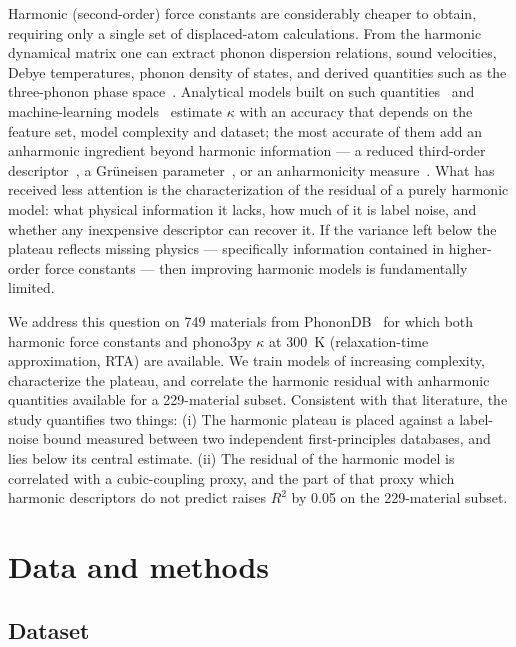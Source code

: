 \documentclass[aps,prm,reprint,onecolumn,groupedaddress]{revtex4-2}
\begin{document}
Harmonic (second-order) force constants are considerably cheaper to obtain, requiring only a single set of displaced-atom calculations. From the harmonic dynamical matrix one can extract phonon dispersion relations, sound velocities, Debye temperatures, phonon density of states, and derived quantities such as the three-phonon phase space~\cite{lindsay2008,li2014mingo}. Analytical models built on such quantities~\cite{slack1973,morelli2006} and machine-learning models~\cite{carrete2014,juneja2019,purcell2023} estimate $\kappa$ with an accuracy that depends on the feature set, model complexity and dataset; the most accurate of them add an anharmonic ingredient beyond harmonic information --- a reduced third-order descriptor~\cite{carrete2014}, a Gr\"uneisen parameter~\cite{juneja2019}, or an anharmonicity measure~\cite{knoop2020,purcell2023}. What has received less attention is the characterization of the residual of a purely harmonic model: what physical information it lacks, how much of it is label noise, and whether any inexpensive descriptor can recover it. If the variance left below the plateau reflects missing physics --- specifically information contained in higher-order force constants --- then improving harmonic models is fundamentally limited.

We address this question on 749 materials from PhononDB~\cite{phonondb} for which both harmonic force constants and phono3py $\kappa$ at 300~K (relaxation-time approximation, RTA) are available. We train models of increasing complexity, characterize the plateau, and correlate the harmonic residual with anharmonic quantities available for a 229-material subset. Consistent with that literature, the study quantifies two things: (i) The harmonic plateau is placed against a label-noise bound measured between two independent first-principles databases, and lies below its central estimate. (ii) The residual of the harmonic model is correlated with a cubic-coupling proxy, and the part of that proxy which harmonic descriptors do not predict raises $R^2$ by 0.05 on the 229-material subset.

\section{Data and methods}

\subsection{Dataset}
\label{sec:dataset}
\end{document}
